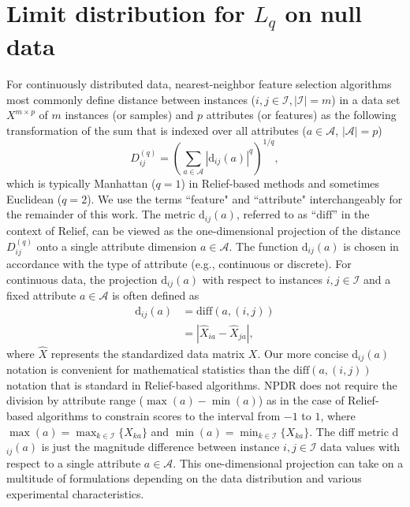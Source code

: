 \documentclass[10pt,letterpaper]{article}
\begin{document}
\section{Limit distribution for \texorpdfstring{$L_q$}{} on null data}\label{sec:notation_and_CLT}
For continuously distributed data, nearest-neighbor feature selection algorithms most commonly define distance between instances ($i,j \in \mathcal{I}, |\mathcal{I}|=m$) in a data set $X^{m \times p}$ of $m$ instances (or samples) and $p$ attributes (or features) as the following transformation of the sum that is indexed over all attributes ($a \in \mathcal{A}$, $|\mathcal{A}|=p$)
\begin{equation}\label{eq:D}
D^{(q)}_{ij}=\left(\sum_{a\in \mathcal{A}}|\text{d}_{ij}(a)|^q\right)^{1/q},
\end{equation}
which is typically Manhattan ($q=1$) in Relief-based methods and sometimes Euclidean ($q=2$). We use the terms ``feature" and ``attribute" interchangeably for the remainder of this work. The metric 
$\text{d}_{ij}(a)$,
referred to as ``$\text{diff}$'' in the context of Relief, can be viewed as the one-dimensional projection of the distance $D^{(q)}_{ij}$ onto a single attribute dimension $a \in \mathcal{A}$. The 
function $\text{d}_{ij}(a)$ is chosen in accordance with the type of attribute (e.g., continuous or discrete).
For continuous data, the projection $\text{d}_{ij}(a)$ with respect to instances $i,j \in \mathcal{I}$ and a fixed attribute $a \in \mathcal{A}$ is often defined as
\begin{equation}\label{eq:diff}
\begin{aligned}
\text{d}_{ij}(a)&=\text{diff}(a,(i,j))\\
& = {|\hat{X}_{ia}-\hat{X}_{ja}|},
\end{aligned}
\end{equation}
where $\hat{X}$ represents the standardized data matrix $X$.
Our more concise d$_{ij}(a)$ notation is convenient for mathematical statistics than the $\text{diff}(a,(i,j))$ notation that is standard in Relief-based algorithms.
NPDR does not require the division by attribute range ($\max(a)-\min(a)$) as in the case of Relief-based algorithms to constrain scores to the interval from $-1$ to $1$, where $\max(a) = \max_{k \in \mathcal{I}}\{X_{ka}\}$ and $\min(a) = \min_{k \in \mathcal{I}}\{X_{ka}\}$. The diff metric d$_{ij}(a)$ is just the magnitude difference between instance $i,j \in \mathcal{I}$ data values with respect to a single attribute $a \in \mathcal{A}$. This one-dimensional projection can take on a multitude of formulations depending on the data distribution and various experimental characteristics. 
\end{document}

